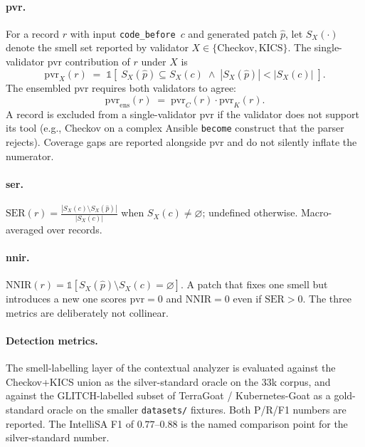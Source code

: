 \documentclass[12pt, a4paper]{report}
\begin{document}
\paragraph{\gls{pvr}.}
For a record $r$ with input \texttt{code\_before}~$c$ and generated patch
$\hat{p}$, let $S_X(\cdot)$ denote the smell set reported by validator
$X \in \{\text{Checkov}, \text{KICS}\}$. The single-validator
\gls{pvr} contribution of $r$ under $X$ is
\begin{equation}
  \mathrm{pvr}_X(r) \;=\;
  \mathbb{1}\!\left[\;S_X\!\left(\hat{p}\right) \subseteq S_X(c) \;\wedge\;
                   |S_X\!\left(\hat{p}\right)| < |S_X(c)|\;\right].
\end{equation}
The ensembled \gls{pvr} requires both validators to agree:
\begin{equation}
  \mathrm{pvr}_{\mathrm{ens}}(r) \;=\; \mathrm{pvr}_C(r) \cdot \mathrm{pvr}_K(r).
\end{equation}
A record is excluded from a single-validator \gls{pvr} if the validator does
not support its tool (e.g., Checkov on a complex Ansible \texttt{become}
construct that the parser rejects). Coverage gaps are reported alongside
\gls{pvr} and do not silently inflate the numerator.

\paragraph{\gls{ser}.}
$\mathrm{SER}(r) = \frac{\left|S_X(c) \setminus S_X(\hat{p})\right|}{\left|S_X(c)\right|}$
when $S_X(c) \neq \varnothing$; undefined otherwise. Macro-averaged
over records.

\paragraph{\gls{nnir}.}
$\mathrm{NNIR}(r) = \mathbb{1}\!\left[S_X(\hat{p}) \setminus S_X(c) = \varnothing\right]$.
A patch that fixes one smell but introduces a new one scores
$\mathrm{pvr}=0$ and $\mathrm{NNIR}=0$ even if $\mathrm{SER}>0$. The three
metrics are deliberately not collinear.

\paragraph{Detection metrics.}
The smell-labelling layer of the contextual analyzer is evaluated against
the Checkov+KICS union as the silver-standard oracle on the 33k corpus, and
against the GLITCH-labelled subset of TerraGoat / Kubernetes-Goat as a
gold-standard oracle on the smaller \texttt{datasets/} fixtures. Both
P/R/F1 numbers are reported. The IntelliSA F1 of $0.77$--$0.88$ is the
named comparison point for the silver-standard number.
\end{document}
